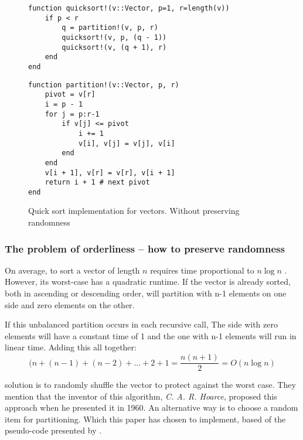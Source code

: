 \documentclass[a4paper, 11pt]{article}
\begin{document}
    \begin{figure}[h]
        \centering
    \begin{verbatim}
function quicksort!(v::Vector, p=1, r=length(v))
    if p < r 
        q = partition!(v, p, r)    
        quicksort!(v, p, (q - 1))
        quicksort!(v, (q + 1), r)
    end
end
    \end{verbatim}
    \begin{verbatim}
function partition!(v::Vector, p, r)
    pivot = v[r]
    i = p - 1
    for j = p:r-1
        if v[j] <= pivot
            i += 1
            v[i], v[j] = v[j], v[i]
        end
    end
    v[i + 1], v[r] = v[r], v[i + 1]
    return i + 1 # next pivot
end
    \end{verbatim}
    \caption{Quick sort implementation for vectors. 
    Without preserving randomness} %
    \label{code:qsvector} %
    \end{figure}

    \subsubsection*{The problem of orderliness -- how to preserve randomness}
    On average, to sort a vector of length $n$ requires time 
    proportional to $n\log n$ \parencite{Segeqick2011Alg4th}. 
    However, 
    its worst-case has a quadratic runtime. If the vector is 
    already sorted, both in ascending or descending order, 
    will partition with n-1 elements on one side and zero 
    elements on the other. 

    If this unbalanced partition occurs in each recursive call, 
    The side with zero elements will have a constant time of 1 and
    the one with n-1 elements will run in linear time.
    Adding this all together:
    \[ (n + (n-1) + (n-2)+ ... + 2 + 1 = \frac{n(n+1)}{2} = O(n\log n) \]

    \textcite{Segeqick2011Alg4th} solution is to randomly shuffle 
    the vector to protect against the worst case. They mention 
    that the inventor of this algorithm, \emph{C. A. R. Hoarce},
    proposed this approach when he presented it in 1960.
    An alternative way is to choose a random item for 
    partitioning. Which this paper has chosen to implement, based 
    of the pseudo-code presented by \textcite{CormenThomasH2022ItA}.
\end{document}
